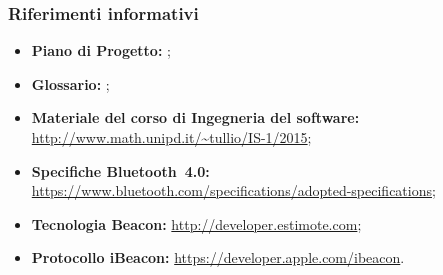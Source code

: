 \documentclass[../StudioDiFattibilita.tex]{subfiles}
\begin{document}
		\subsubsection{Riferimenti informativi}
		\begin{itemize}
			\item \textbf{Piano di Progetto:} \pianodiprogettov;
			\item \textbf{Glossario:} \glossariov;
			\item \textbf{Materiale del corso di Ingegneria del software\g:}\\\url{http://www.math.unipd.it/~tullio/IS-1/2015};
			\item \textbf{Specifiche Bluetooth\g\ 4.0:}\\\url{https://www.bluetooth.com/specifications/adopted-specifications};
			\item \textbf{Tecnologia Beacon\g:} \url{http://developer.estimote.com};
			\item \textbf{Protocollo iBeacon\g:} \url{https://developer.apple.com/ibeacon}.
		\end{itemize}
\end{document}
